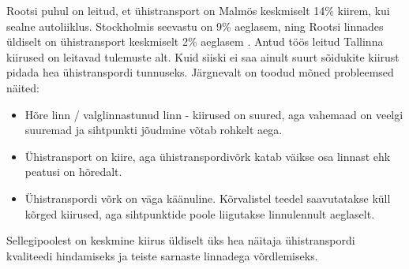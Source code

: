 Rootsi puhul on leitud, et ühistransport on Malmös keskmiselt 14\% kiirem, kui sealne autoliiklus. Stockholmis seevastu on 9\% aeglasem, ning Rootsi linnades üldiselt on ühistransport keskmiselt 2\% aeglasem \cite{urbansci3010025}. Antud töös leitud Tallinna kiirused on leitavad tulemuste alt. Kuid siiski ei saa ainult suurt sõidukite kiirust pidada hea ühistranspordi tunnuseks. Järgnevalt on toodud mõned probleemsed näited:
\begin{itemize}
    \item Hõre linn / valglinnastunud linn - kiirused on suured, aga vahemaad on veelgi suuremad ja sihtpunkti jõudmine võtab rohkelt aega.
    \item Ühistransport on kiire, aga ühistranspordivõrk katab väikse osa linnast ehk peatusi on hõredalt.
    \item Ühistranspordi võrk on väga käänuline. Kõrvalistel teedel saavutatakse küll kõrged kiirused, aga sihtpunktide poole liigutakse linnulennult aeglaselt.
\end{itemize}
Sellegipoolest on keskmine kiirus üldiselt üks hea näitaja ühistranspordi kvaliteedi hindamiseks ja teiste sarnaste linnadega võrdlemiseks.




